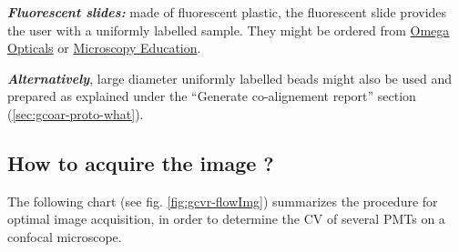 \documentclass[a4paper, 11pt]{report}%
\begin{document}
\begin{itemize*}
	\item \textbf{\textit{Fluorescent slides:}} made of fluorescent plastic, the fluorescent slide provides the user with a uniformly labelled sample. They might be ordered from \href{https://www.omegafilters.com/index.php?page=prod_rslides_pro}{Omega Opticals} or \href{http://www.microscopyeducation.com/fluorrefslides.html}{Microscopy Education}.
	\item \textbf{\textit{Alternatively}}, large diameter uniformly labelled beads might also be used and prepared as explained under the ``Generate co-alignement report'' section (\ref{sec:gcoar-proto-what}).
\end{itemize*}

\subsection{How to acquire the image ?}
\label{sec:gcvr-flow}

The following chart (see fig. \ref{fig:gcvr-flowImg}) summarizes the procedure for optimal image acquisition, in order to determine the CV of several PMTs on a confocal microscope.
\end{document}
